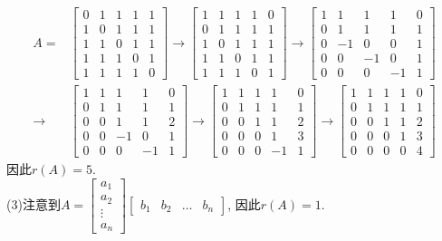 \begin{displaymath}
\begin{aligned}A=&\left[\begin{array}{ccccc}0&1&1&1&1\\1&0&1&1&1\\1&1&0&1&1\\ 1&1&1&0&1\\1&1&1&1&0\end{array}\right]\rightarrow
\left[\begin{array}{ccccc}1&1&1&1&0 \\0&1&1&1&1\\1&0&1&1&1\\1&1&0&1&1\\ 1&1&1&0&1\end{array}\right]
\rightarrow \left[\begin{array}{ccccc}1&1&1&1&0 \\0&1&1&1&1\\0&-1&0&0&1\\0&0&-1&0&1\\ 0&0&0&-1&1\end{array}\right]\\
\rightarrow &\left[\begin{array}{ccccc}1&1&1&1&0 \\0&1&1&1&1\\0&0&1&1&2\\0&0&-1&0&1\\ 0&0&0&-1&1\end{array}\right]
\rightarrow \left[\begin{array}{ccccc}1&1&1&1&0 \\0&1&1&1&1\\0&0&1&1&2\\0&0&0&1&3\\ 0&0&0&-1&1\end{array}\right]
\rightarrow \left[\begin{array}{ccccc}1&1&1&1&0 \\0&1&1&1&1\\0&0&1&1&2\\0&0&0&1&3\\ 0&0&0&0&4\end{array}\right] \end{aligned}\end{displaymath}
因此$r(A)=5$.\\
(3)注意到$A=\begin{bmatrix}a_1\\a_2\\ \vdots\\a_n\end{bmatrix}\begin{bmatrix}b_1&b_2&\dots&b_n\end{bmatrix}$, 因此$r(A)=1$.
